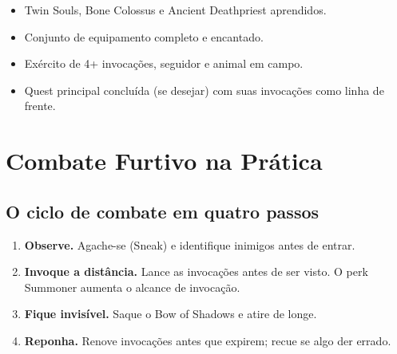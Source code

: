 \documentclass[11pt,a4paper,oneside,openany]{book}
\newcommand{\perk}[1]{\textsf{\textcolor{SoulCairnPurple}{#1}}}
\begin{document}
\begin{checkpoint}
\begin{itemize}
  \item Twin Souls, Bone Colossus e Ancient Deathpriest aprendidos.
  \item Conjunto de equipamento completo e encantado.
  \item Exército de 4+ invocações, seguidor e animal em campo.
  \item Quest principal concluída (se desejar) com suas invocações como linha de frente.
\end{itemize}
\end{checkpoint}

\chapter{Combate Furtivo na Prática}

\section{O ciclo de combate em quatro passos}
\begin{enumerate}
  \item \textbf{Observe.} Agache-se (Sneak) e identifique inimigos antes de entrar.
  \item \textbf{Invoque a distância.} Lance as invocações antes de ser visto. O perk \perk{Summoner} aumenta o alcance de invocação.
  \item \textbf{Fique invisível.} Saque o Bow of Shadows e atire de longe.
  \item \textbf{Reponha.} Renove invocações antes que expirem; recue se algo der errado.
\end{enumerate}

\Needspace{8cm}
\end{document}
